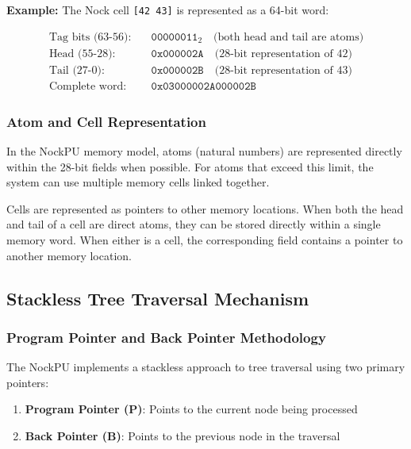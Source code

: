 \documentclass[twoside]{article}
\begin{document}
\noindent
\textbf{Example:} The Nock cell \texttt{[42 43]} is represented as a 64-bit word:

\begin{align}
\text{Tag bits (63-56):} &\quad \texttt{00000011}_2 \quad \text{(both head and tail are atoms)} \nonumber \\
\text{Head (55-28):} &\quad \texttt{0x000002A} \quad \text{(28-bit representation of 42)} \nonumber \\
\text{Tail (27-0):} &\quad   \texttt{0x000002B} \quad \text{(28-bit representation of 43)} \nonumber \\
\text{Complete word:} &\quad \texttt{0x03000002A000002B} \nonumber
\end{align}

\subsubsection{Atom and Cell Representation}

In the NockPU memory model, atoms (natural numbers) are represented directly within the 28-bit fields when possible. For atoms that exceed this limit, the system can use multiple memory cells linked together.

Cells are represented as pointers to other memory locations. When both the head and tail of a cell are direct atoms, they can be stored directly within a single memory word. When either is a cell, the corresponding field contains a pointer to another memory location.

\subsection{Stackless Tree Traversal Mechanism}

\subsubsection{Program Pointer and Back Pointer Methodology}

The NockPU implements a stackless approach to tree traversal \citep{Burrows2009} using two primary pointers:

\begin{enumerate}
  \item \textbf{Program Pointer (P)}: Points to the current node being processed
  \item \textbf{Back Pointer (B)}: Points to the previous node in the traversal
\end{enumerate}
\end{document}
